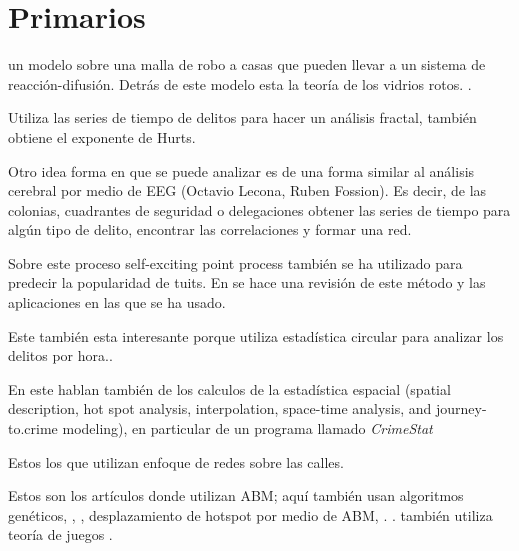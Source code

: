 \documentclass[onecolumn,12pt,letterpaper]{article}
\begin{document}
\section{Primarios}

un modelo sobre una malla de robo a casas que pueden llevar a un sistema de reacción-difusión. Detrás de este modelo esta la teoría de los vidrios rotos. \cite{short_statistical_2008}. 


Utiliza las series de tiempo de delitos para hacer un análisis fractal, también obtiene el exponente de Hurts\cite{melgarejo_multifractal_2017}.  


Otro idea forma en que se puede analizar es de una forma similar al análisis cerebral por medio de EEG (Octavio Lecona, Ruben Fossion). Es decir, de las colonias, cuadrantes de seguridad o delegaciones obtener las series de tiempo para algún tipo de delito, encontrar las correlaciones y formar una red. 



Sobre este proceso self-exciting point process también se ha utilizado para predecir la popularidad de tuits\cite{zhao2015seismic}. En \cite{reinhart2018review} se hace una revisión de este método y las aplicaciones en las que se ha usado. 

Este también esta interesante porque utiliza estadística circular para analizar los delitos por hora.\cite{brunsdon2006using}.


En este hablan también de los calculos de la estadística espacial (spatial description, hot spot analysis, interpolation, space-time analysis, and journey-to.crime modeling), en particular de un programa llamado \textit{CrimeStat}\cite{levine2006crime}

Estos los que utilizan enfoque de redes sobre las calles\cite{rosser_predictive_2017}. \cite{porta_network_2006} \cite{porta_network_2006-1} \cite{davies_modelling_2013}

Estos son los artículos donde utilizan ABM; aquí también usan algoritmos genéticos\cite{furtado_bio-inspired_2009}, \cite{malleson_agent-based_2009}, \cite{malleson_crime_2010} , desplazamiento de hotspot por medio de ABM\cite{wang_analyzing_2014}, \cite{devia_generating_2013}. \cite{hegemann_geographical_2011}. \cite{groff_simulation_2007} también utiliza teoría de juegos  \cite{bruni_what_2013}.
\end{document}
